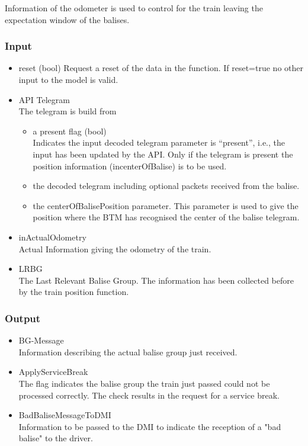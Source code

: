 \documentclass{template/openetcs_report}
\begin{document}
Information of the odometer is used to control for the train leaving the expectation window of the balises.

\subsubsection{Input}
\begin{itemize}
\item reset	(bool)	
Request a reset of the data in the function.
If reset=true no other input to the model is valid.
\item API Telegram \\
The telegram is build from 

\begin{itemize}
\item a present flag (bool)\\
Indicates the input decoded telegram parameter is “present”, i.e., the input has been updated by the API.
Only if the telegram is present the position information (incenterOfBalise) is to be used.\\
\item the decoded telegram including optional packets received from the balise.
\item the centerOfBalisePosition parameter. This parameter is used to give the position where the BTM has recognised the center of the balise telegram.
\end{itemize}

\item inActualOdometry\\
Actual Information giving the odometry of the train. 
\item LRBG\\
The Last Relevant Balise Group. The information has been collected before by the train position function.\\
\end{itemize}

\subsubsection{Output}
\begin{itemize}
\item BG-Message\\
Information describing the actual balise group just received.
\item ApplyServiceBreak\\
The flag indicates the balise group the train just passed could not be processed correctly. The check results in the request for a service break.\\
\item BadBaliseMessageToDMI\\
Information to be passed to the DMI to indicate the reception of a "bad balise" to the driver.
\end{itemize}
\end{document}
